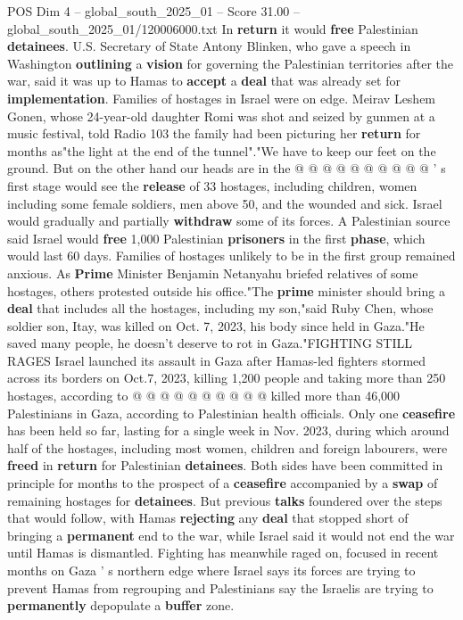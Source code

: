 \begin{textsample}{POS Dim 4 – global\_south\_2025\_01 – Score 31.00 – global\_south\_2025\_01/120006000.txt}
In \textbf{return} it would \textbf{free} Palestinian \textbf{detainees}.
U.S.
Secretary of State Antony Blinken, who gave a speech in Washington \textbf{outlining} a \textbf{vision} for governing the Palestinian territories after the war, said it was up to Hamas to \textbf{accept} a \textbf{deal} that was already set for \textbf{implementation}.
Families of hostages in Israel were on edge.
Meirav Leshem Gonen, whose 24-year-old daughter Romi was shot and seized by gunmen at a music festival, told Radio 103 the family had been picturing her \textbf{return} for months as"the light at the end of the tunnel"."We have to keep our feet on the ground.
But on the other hand our heads are in the @ @ @ @ @ @ @ @ @ @ ' s first stage would see the \textbf{release} of 33 hostages, including children, women including some female soldiers, men above 50, and the wounded and sick.
Israel would gradually and partially \textbf{withdraw} some of its forces.
A Palestinian source said Israel would \textbf{free} 1,000 Palestinian \textbf{prisoners} in the first \textbf{phase}, which would last 60 days.
Families of hostages unlikely to be in the first group remained anxious.
As \textbf{Prime} Minister Benjamin Netanyahu briefed relatives of some hostages, others protested outside his office."The \textbf{prime} minister should bring a \textbf{deal} that includes all the hostages, including my son,"said Ruby Chen, whose soldier son, Itay, was killed on Oct. 7, 2023, his body since held in Gaza."He saved many people, he doesn't deserve to rot in Gaza."FIGHTING STILL RAGES Israel launched its assault in Gaza after Hamas-led fighters stormed across its borders on Oct.7, 2023, killing 1,200 people and taking more than 250 hostages, according to @ @ @ @ @ @ @ @ @ @ killed more than 46,000 Palestinians in Gaza, according to Palestinian health officials.
Only one \textbf{ceasefire} has been held so far, lasting for a single week in Nov. 2023, during which around half of the hostages, including most women, children and foreign labourers, were \textbf{freed} in \textbf{return} for Palestinian \textbf{detainees}.
Both sides have been committed in principle for months to the prospect of a \textbf{ceasefire} accompanied by a \textbf{swap} of remaining hostages for \textbf{detainees}.
But previous \textbf{talks} foundered over the steps that would follow, with Hamas \textbf{rejecting} any \textbf{deal} that stopped short of bringing a \textbf{permanent} end to the war, while Israel said it would not end the war until Hamas is dismantled.
Fighting has meanwhile raged on, focused in recent months on Gaza ' s northern edge where Israel says its forces are trying to prevent Hamas from regrouping and Palestinians say the Israelis are trying to \textbf{permanently} depopulate a \textbf{buffer} zone.

\end{textsample}
